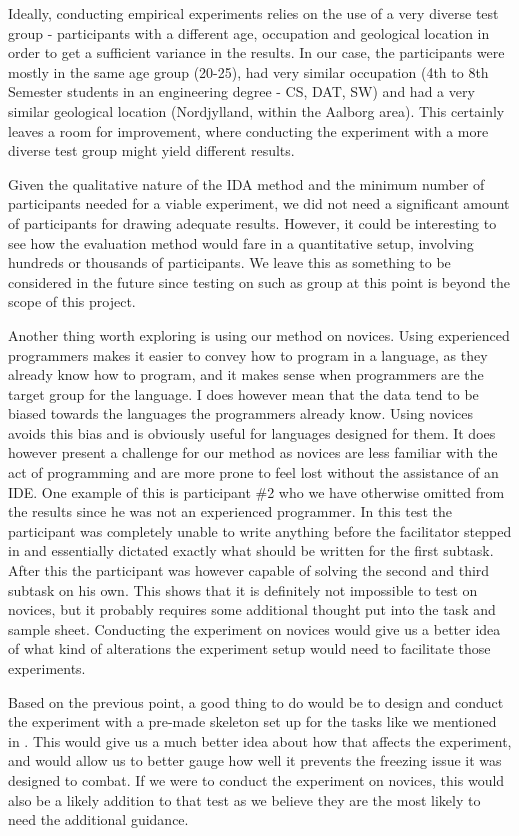 Ideally, conducting empirical experiments relies on the use of a very diverse test group - participants with a different age, occupation and geological location in order to get a sufficient variance in the results. In our case, the participants were mostly in the same age group (20-25), had very similar occupation (4th to 8th Semester students in an engineering degree - CS, DAT, SW) and had a very similar geological location (Nordjylland, within the Aalborg area). This certainly leaves a room for improvement, where conducting the experiment with a more diverse test group might yield different results.

Given the qualitative nature of the IDA method and the minimum number of participants needed for a viable experiment, we did not need a significant amount of participants for drawing adequate results. However, it could be interesting to see how the evaluation method would fare in a quantitative setup, involving hundreds or thousands of participants. We leave this as something to be considered in the future since testing on such as group at this point is beyond the scope of this project.

Another thing worth exploring is using our method on novices.
Using experienced programmers makes it easier to convey how to program in a language, as they already know how to program, and it  makes sense when programmers are the target group for the language.
I does however mean that the data tend to be biased towards the languages the programmers already know.
Using novices avoids this bias and is obviously useful for languages designed for them.
It does however present a challenge for our method as novices are less familiar with the act of programming and are more prone to feel lost without the assistance of an IDE.
One example of this is participant \#2 who we have otherwise omitted from the results since he was not an experienced programmer.
In this test the participant was completely unable to write anything before the facilitator stepped in and essentially dictated exactly what should be written for the first subtask.
After this the participant was however capable of solving the second and third subtask on his own.
This shows that it is definitely not impossible to test on novices, but it probably requires some additional thought put into the task and sample sheet.
Conducting the experiment on novices would give us a better idea of what kind of alterations the experiment setup would need to facilitate those experiments.

Based on the previous point, a good thing to do would be to design and conduct the experiment with a pre-made skeleton set up for the tasks like we mentioned in .
This would give us a much better idea about how that affects the experiment, and would allow us to better gauge how well it prevents the freezing issue it was designed to combat.
If we were to conduct the experiment on novices, this would also be a likely addition to that test as we believe they are the most likely to need the additional guidance. 


